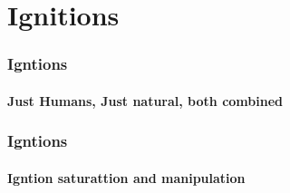 \section{Ignitions}

\begin{frame}
    \frametitle{Igntions}
    \framesubtitle{Just Humans, Just natural, both combined}


\end{frame}

\begin{frame}
    \frametitle{Igntions}
    \framesubtitle{Igntion saturattion and manipulation}


\end{frame}
